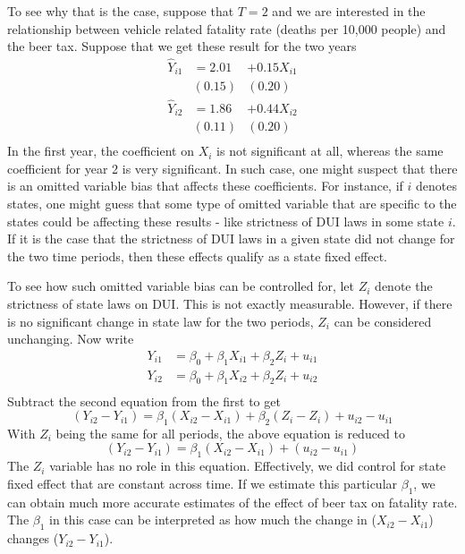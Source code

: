 \documentclass[12pt]{article}
\theoremstyle{definition}
\theoremstyle{property}
\theoremstyle{assumption}
\theoremstyle{example}
\theoremstyle{comment}
\begin{document}
To see why that is the case, suppose that $T=2$ and we are interested in the relationship between vehicle related fatality rate (deaths per 10,000 people) and the beer tax. Suppose that we get these result for the two years
\[
\begin{aligned}
\hat{Y}_{i1} &=2.01 &+ 0.15X_{i1}\\
                    &(0.15)&(0.20) \\
\hat{Y}_{i2} &=1.86 &+ 0.44X_{i2}\\
                    &(0.11)&(0.20) \\                    
\end{aligned}
\]
In the first year, the coefficient on $X_i$ is not significant at all, whereas the same coefficient for year 2 is very significant. In such case, one might suspect that there is an omitted variable bias that affects these coefficients. For instance, if $i$ denotes states, one might guess that some type of omitted variable that are specific to the states could be affecting these results - like strictness of DUI laws in some state $i$. If it is the case that the strictness of DUI laws in a given state did not change for the two time periods, then these effects qualify as a state fixed effect. \par\medskip 
To see how such omitted variable bias can be controlled for, let $Z_i$ denote the strictness of state laws on DUI. This is not exactly measurable. However, if there is no significant change in state law for the two periods, $Z_i$ can be considered unchanging. Now write
\[
\begin{aligned}
Y_{i1}& = \beta_0 + \beta_1X_{i1}+\beta_2 Z_{i}+u_{i1} \\                
Y_{i2}& = \beta_0 + \beta_1X_{i2}+\beta_2 Z_{i}+u_{i2} \\                
\end{aligned}
\]
Subtract the second equation from the first to get
\[
(Y_{i2}-Y_{i1}) = \beta_1(X_{i2}-X_{i1}) +\beta_2(Z_{i}-Z_{i}) + u_{i2}-u_{i1}
\]
With $Z_i$ being the same for all periods, the above equation is reduced to
\[
(Y_{i2}-Y_{i1}) = \beta_1(X_{i2}-X_{i1}) +(u_{i2}-u_{i1})
\]
The $Z_i$ variable has no role in this equation. Effectively, we did control for state fixed effect that are constant across time. If we estimate this particular $\beta_1$, we can obtain much more accurate estimates of the effect of beer tax on fatality rate. The $\beta_1$ in this case can be interpreted as how much the change in ($X_{i2}-X_{i1}$) changes ($Y_{i2}-Y_{i1}$). \par\medskip
\end{document}
